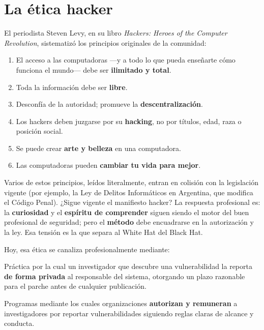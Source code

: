 \documentclass[11pt,a4paper]{article}
\begin{document}
\section{La ética hacker}
El periodista Steven Levy, en su libro \textit{Hackers: Heroes of the Computer Revolution}, sistematizó los principios originales de la comunidad:

\begin{enumerate}[leftmargin=*]
  \item El acceso a las computadoras ---y a todo lo que pueda enseñarte cómo funciona el mundo--- debe ser \textbf{ilimitado y total}.
  \item Toda la información debe ser \textbf{libre}.
  \item Desconfía de la autoridad; promueve la \textbf{descentralización}.
  \item Los hackers deben juzgarse por su \textbf{hacking}, no por títulos, edad, raza o posición social.
  \item Se puede crear \textbf{arte y belleza} en una computadora.
  \item Las computadoras pueden \textbf{cambiar tu vida para mejor}.
\end{enumerate}

\begin{reflexion}
Varios de estos principios, leídos literalmente, entran en colisión con la legislación vigente (por ejemplo, la Ley de Delitos Informáticos en Argentina, que modifica el Código Penal). ¿Sigue vigente el manifiesto hacker? La respuesta profesional es: la \textbf{curiosidad} y el \textbf{espíritu de comprender} siguen siendo el motor del buen profesional de seguridad; pero el \textbf{método} debe encuadrarse en la autorización y la ley. Esa tensión es la que separa al White Hat del Black Hat.
\end{reflexion}

Hoy, esa ética se canaliza profesionalmente mediante:

\begin{definicion}
Práctica por la cual un investigador que descubre una vulnerabilidad la reporta \textbf{de forma privada} al responsable del sistema, otorgando un plazo razonable para el parche antes de cualquier publicación.
\end{definicion}

\begin{definicion}
Programas mediante los cuales organizaciones \textbf{autorizan y remuneran} a investigadores por reportar vulnerabilidades siguiendo reglas claras de alcance y conducta.
\end{definicion}
\end{document}
